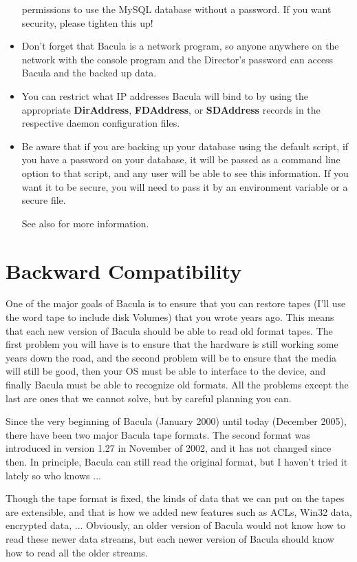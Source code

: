 \begin{itemize}
   permissions to use the MySQL database without a  password. If you want
   security, please tighten this up! 
\item Don't forget that Bacula is a network program, so anyone anywhere  on
   the network with the console program and the Director's password  can access
   Bacula and the backed up data. 
\item You can restrict what IP addresses Bacula will bind to by using the 
   appropriate {\bf DirAddress}, {\bf FDAddress}, or {\bf SDAddress}  records in
   the respective daemon configuration files. 
\item Be aware that if you are backing up your database using the default
   script, if you have a password on your database, it will be passed as
   a command line option to that script, and any user will be able to see
   this information. If you want it to be secure, you will need to pass it
   by an environment variable or a secure file.

   See also 
   for more information.
\end{itemize}


\section{Backward Compatibility}
One of the major goals of Bacula is to ensure that you can restore
tapes (I'll use the word tape to include disk Volumes) that you wrote years
ago.  This means that each new version of Bacula should be able to read old
format tapes. The first problem you will have is to ensure that the 
hardware is still working some years down the road, and the second
problem will be to ensure that the media will still be good, then 
your OS must be able to interface to the device, and finally Bacula
must be able to recognize old formats.  All the problems except the
last are ones that we cannot solve, but by careful planning you can.

Since the very beginning of Bacula (January 2000) until today (December
2005), there have been two major Bacula tape formats.  The second format
was introduced in version 1.27 in November of 2002, and it has not
changed since then.  In principle, Bacula can still read the original
format, but I haven't tried it lately so who knows ...

Though the tape format is fixed, the kinds of data that we can put on the
tapes are extensible, and that is how we added new features
such as ACLs, Win32 data, encrypted data, ...  Obviously, an older
version of Bacula would not know how to read these newer data streams,
but each newer version of Bacula should know how to read all the 
older streams.

